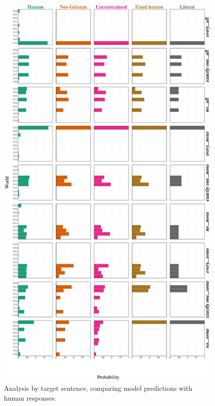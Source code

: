 \documentclass[leqno,12pt]{article}
\begin{document}
{\begin{figure}[!t]
  \centering
  \includegraphics[height=0.92\textheight]{allmodels-binary}
  \caption{Analysis by target sentence, comparing model predictions
    with human responses.}
  \label{fig:exp-analysis}
\end{figure}

}
\end{document}
